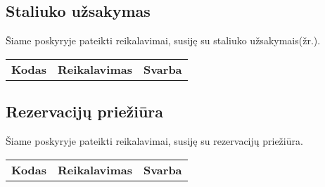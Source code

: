 \documentclass{VUMIFPSkursinis}
\begin{document}
\pagebreak


\subsection{Staliuko užsakymas}
Šiame poskyryje pateikti reikalavimai, susiję su staliuko užsakymais(žr.).
\begin{center}
	\begin{table}[H]
	\begin{tabular}{|p{2cm}|p{}|p{}|}
	
	\hline
	    \rowcolor{lightgray}
		\multicolumn{3}{|c|}{Staliuko užsakymas}\\
		
	\hline
		\multicolumn{1}{|c|}{{\bfseries Kodas}}&
		\multicolumn{1}{|c|}{{\bfseries Reikalavimas}}&
		\multicolumn{1}{|c|}{{\bfseries Svarba}}\\

	\hline	
	
	\end{tabular}		

	\end{table}


\end{center}

\pagebreak

\subsection{Rezervacijų priežiūra}
Šiame poskyryje pateikti reikalavimai, susiję su rezervacijų priežiūra.
\begin{center}
	\begin{table}[H]
	\begin{tabular}{|p{2cm}|p{}|p{}|}
	
	\hline
	    \rowcolor{lightgray}
		\multicolumn{3}{|c|}{Rezervacijų priežiūra}\\
		
	\hline
		\multicolumn{1}{|c|}{{\bfseries Kodas}}&
		\multicolumn{1}{|c|}{{\bfseries Reikalavimas}}&
		\multicolumn{1}{|c|}{{\bfseries Svarba}}\\

	\hline	
	
	\end{tabular}		

	\end{table}


\end{center}

\pagebreak
\end{document}
